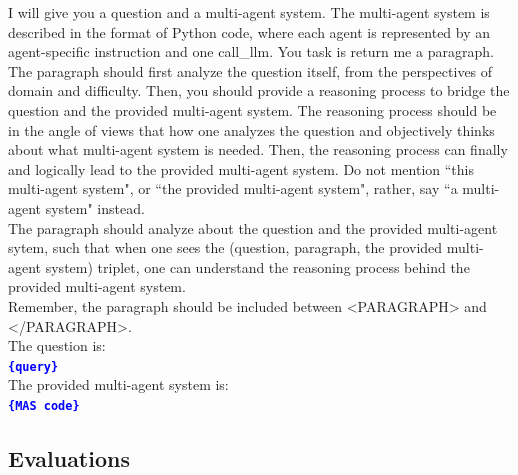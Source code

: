 \documentclass{article}
\theoremstyle{plain}
\theoremstyle{definition}
\theoremstyle{remark}
\begin{document}
\begin{table}[h]
\caption{The prompt for generating a reasoning process if the refined MAS fails. This prompt is fed to GPT-4o-2024-11-20 to generate a reasoning statement. The prompt is integrated with a user query and a selected MAS represented by Python code.}
\label{tab:prompt_refinement_fail}
\begin{response}
I will give you a question and a multi-agent system. The multi-agent system is described in the format of Python code, where each agent is represented by an agent-specific instruction and one call\_llm. You task is return me a paragraph.\\

The paragraph should first analyze the question itself, from the perspectives of domain and difficulty. Then, you should provide a reasoning process to bridge the question and the provided multi-agent system. The reasoning process should be in the angle of views that how one analyzes the question and objectively thinks about what multi-agent system is needed. Then, the reasoning process can finally and logically lead to the provided multi-agent system. Do not mention ``this multi-agent system", or ``the provided multi-agent system", rather, say ``a multi-agent system" instead.\\

The paragraph should analyze about the question and the provided multi-agent sytem, such that when one sees the (question, paragraph, the provided multi-agent system) triplet, one can understand the reasoning process behind the provided multi-agent system.\\

Remember, the paragraph should be included between <PARAGRAPH> and </PARAGRAPH>.\\

The question is:\\
\textbf{\textcolor{blue}{\texttt{\{query\}}}}\\

The provided multi-agent system is:\\
\textbf{\textcolor{blue}{\texttt{\{MAS code\}}}}
\end{response}
\end{table}

\subsection{Evaluations}
\label{app:eval}
\end{document}
